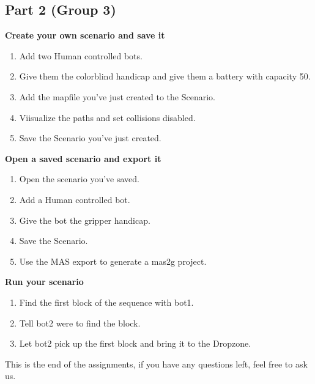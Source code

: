 \newpage

\subsection*{Part 2 (Group 3)}
\textbf{Create your own scenario and save it}
\begin{enumerate}
\item Add two Human controlled bots.
\item Give them the colorblind handicap and give them a battery with capacity 50.
\item Add the mapfile you've just created to the Scenario.
\item Viisualize the paths and set collisions disabled.
\item Save the Scenario you've just created.
\end{enumerate}

\textbf{Open a saved scenario and export it}
\begin{enumerate}
\item Open the scenario you've saved.
\item Add a Human controlled bot.
\item Give the bot the gripper handicap.
\item Save the Scenario.
\item Use the MAS export to generate a mas2g project.
\end{enumerate}

\textbf{Run your scenario}
\begin{enumerate}
\item Find the first block of the sequence with bot1.
\item Tell bot2 were to find the block.
\item Let bot2 pick up the first block and bring it to the Dropzone.
\end{enumerate}

This is the end of the assignments, if you have any questions left, feel free to ask us.
\pagebreak